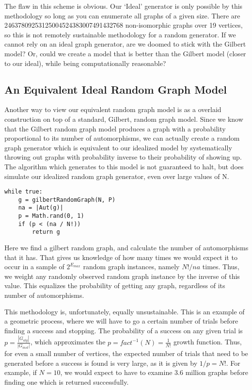 The flaw in this scheme is obvious.
Our `Ideal' generator is only possible by this methodology so long as you can enumerate all graphs of a given size.
There are 24637809253125004524383007491432768 non-isomorphic graphs over 19 vertices, so this is not remotely sustainable methodology for a random generator.
If we cannot rely on an ideal graph generator, are we doomed to stick with the Gilbert model?
Or, could we create a model that is better than the Gilbert model (closer to our ideal), while being computationally reasonable?

\subsection{An Equivalent Ideal Random Graph Model}

Another way to view our equivalent random graph model is as a overlaid construction on top of a standard, Gilbert, random graph model.
Since we know that the Gilbert random graph model produces a graph with a probability proportional to its number of automorphisms, we can actually create a random graph generator which is equivalent to our idealized model by systematically throwing out graphs with probability inverse to their probability of showing up.
The algorithm which generates to this model is not guaranteed to halt, but does simulate our idealized random graph generator, even over large values of N.

\begin{lstlisting}[frame=single]
while true:
	g = gilbertRandomGraph(N, P)
	na = |Aut(g)|
	p = Math.rand(0, 1)
	if (p < (na / N!))
		return g
\end{lstlisting}

Here we find a gilbert random graph, and calculate the number of automorphisms that it has.
That gives us knowledge of how many times we would expect it to occur in a sample of $2^{E_{max}}$ random graph instances, namely $N! / na$ times.
Thus, we weight any randomly observed random graph instance by the inverse of this value.
This equalizes the probability of getting any graph, regardless of its number of automorphisms.

This methodology is, unfortunately, equally unsustainable.
This is an example of a geometric process, where we will have to go a certain number of trials before finding a success and stopping. 
The probability of a success on any given trial is $p = \frac{|G_{alg}|}{|G_{inst}|}$, which approximates the $p = fact^{-1}(N) = \frac{1}{N!}$ growth function.
Thus, for even a small number of vertices, the expected number of trials that need to be generated before a success is found is very large, as it is given by $1/p = N!$. 
For example, if $N=10$, we would expect to have to examine 3.6 million graphs before finding one which is returned successfully.

